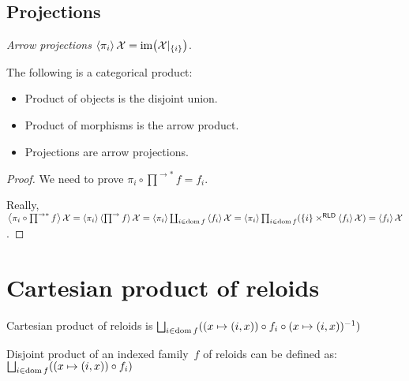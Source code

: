 \subsection{Projections}


\begin{defn}
\emph{Arrow projections}
$\left\langle \pi_i\right\rangle\mathcal{X} = \operatorname{im}\bigl(\mathcal{X}|_{\{i\}}\bigr)$.
\end{defn}

\begin{thm}
The following is a categorical product:
\begin{itemize}
\item Product of objects is the disjoint union.
\item Product of morphisms is the arrow product.
\item Projections are arrow projections.
\end{itemize}
\end{thm}

\begin{proof}
We need to prove $\pi_i\circ\prod^{\rightarrow\ast}f=f_i$.

Really, $\left\langle \pi_i\circ\prod^{\rightarrow\ast}f\right\rangle\mathcal{X}=\left\langle \pi_i\right\rangle\left\langle \prod^{\rightarrow}f\right\rangle\mathcal{X}=\left\langle \pi_i\right\rangle\coprod_{i\in\operatorname{dom} f}\left\langle f_i\right\rangle\mathcal{X}=\left\langle \pi_i\right\rangle\prod_{i\in\operatorname{dom} f}(\{i\}\times^{\mathsf{RLD}}\left\langle f_i\right\rangle\mathcal{X})=\left\langle f_i\right\rangle\mathcal{X}$.
\end{proof}

\section{Cartesian product of reloids}

Cartesian product of reloids is $\bigsqcup_{i\in\dom f}((x\mapsto(i,x))\circ f_i\circ(x\mapsto(i,x))^{-1})$

Disjoint product of an indexed family~$f$ of reloids can be defined as:
$\bigsqcup_{i\in\dom f}((x\mapsto(i,x))\circ f_i)$

